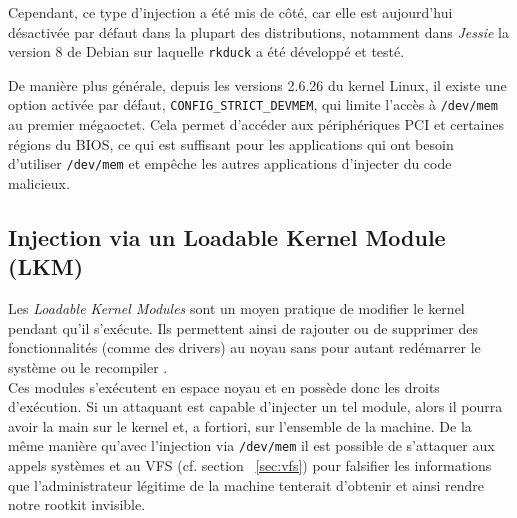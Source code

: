 \documentclass[12pt]{article}
\begin{document}
        Cependant, ce type d'injection a été mis de côté, car elle est aujourd'hui désactivée par défaut dans la plupart des distributions, notamment dans \textit{Jessie} la version 8 de Debian sur laquelle \texttt{rkduck} a été développé et testé.
        
        De manière plus générale, depuis les versions 2.6.26 du kernel Linux, il existe une option activée par défaut, \texttt{CONFIG\_STRICT\_DEVMEM}, qui limite l'accès à \texttt{/dev/mem} au premier mégaoctet. Cela permet d'accéder aux périphériques PCI et certaines régions du BIOS, ce qui est suffisant pour les applications qui ont besoin d'utiliser \texttt{/dev/mem} et empêche les autres applications d'injecter du code malicieux. 


    \subsection{Injection via un Loadable Kernel Module (LKM)}

        Les \textit{Loadable Kernel Modules} sont un moyen pratique de modifier le kernel pendant qu'il s'exécute. Ils permettent ainsi de rajouter ou de supprimer des fonctionnalités (comme des drivers) au noyau sans pour autant redémarrer le système ou le recompiler \cite{LKM}. \\
        
        Ces modules s'exécutent en espace noyau et en possède donc les droits d'exécution. Si un attaquant est capable d'injecter un tel module, alors il pourra avoir la main sur le kernel et, a fortiori, sur l'ensemble de la machine. De la même manière qu'avec l'injection via \texttt{/dev/mem} il est possible de s'attaquer aux appels systèmes et au VFS (cf. section ~\ref{sec:vfs}) pour falsifier les informations que l'administrateur légitime de la machine tenterait d'obtenir et ainsi rendre notre rootkit invisible. \\
        
\end{document}
